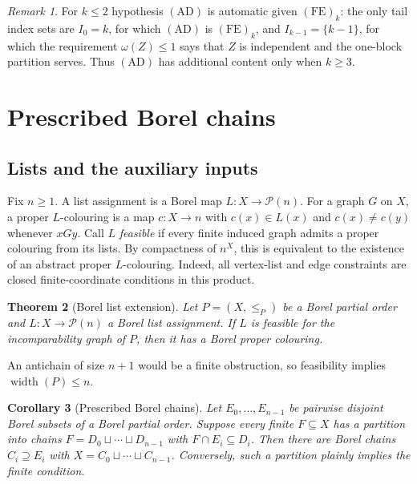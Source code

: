 \documentclass[11pt,reqno]{amsart}
\theoremstyle{plain}
\newtheorem{theorem}{Theorem}[section]
\newtheorem{corollary}[theorem]{Corollary}
\theoremstyle{definition}
\theoremstyle{remark}
\newtheorem{remark}[theorem]{Remark}
\newcommand{\wdt}{\operatorname{width}}
\newcommand{\cl}{\omega}
\begin{document}
\begin{remark}
\label{rem:AD-content}
For $k\le2$ hypothesis $\mathrm{(AD)}$ is automatic given $\mathrm{(FE)}_k$:
the only tail index sets are $I_0=k$, for which $\mathrm{(AD)}$ is
$\mathrm{(FE)}_k$, and $I_{k-1}=\{k-1\}$, for which the requirement
$\cl(Z)\le1$ says that $Z$ is independent and the one-block partition serves.
Thus $\mathrm{(AD)}$ has additional content only when $k\ge3$.
\end{remark}

\section{Prescribed Borel chains}
\label{sec:list-extension}

\subsection{Lists and the auxiliary inputs}

Fix $n\ge1$. A list assignment is a Borel map
$L:X\to\mathcal P(n)$.
For a graph $G$ on $X$, a proper $L$-colouring is a map $c:X\to n$ with
$c(x)\in L(x)$ and $c(x)\ne c(y)$ whenever $xGy$. Call $L$ \emph{feasible}
if every finite induced graph admits a proper colouring from its lists.
By compactness of $n^X$, this is equivalent to the existence of an
abstract proper $L$-colouring. Indeed, all vertex-list and edge constraints
are closed finite-coordinate conditions in this product.

\begin{theorem}[Borel list extension]\label{list-thm:main}
Let $P=(X,\le_P)$ be a Borel partial order and $L:X\to\mathcal P(n)$ a
Borel list assignment. If $L$ is feasible for the incomparability graph of
$P$, then it has a Borel proper colouring.
\end{theorem}

An antichain of size $n+1$ would be a finite obstruction, so feasibility
implies $\wdt(P)\le n$.

\begin{corollary}[Prescribed Borel chains]\label{list-cor:prescription}
Let $E_0,\ldots,E_{n-1}$ be pairwise disjoint Borel subsets of a Borel partial
order. Suppose every finite $F\subseteq X$ has a partition into chains
$F=D_0\sqcup\cdots\sqcup D_{n-1}$ with $F\cap E_i\subseteq D_i$. Then
there are Borel chains $C_i\supseteq E_i$ with
$X=C_0\sqcup\cdots\sqcup C_{n-1}$. Conversely, such a partition plainly
implies the finite condition.
\end{corollary}
\end{document}
